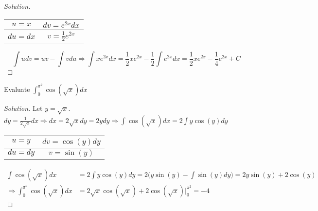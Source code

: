 \documentclass[crop=false,class=article,oneside]{standalone}
\begin{document}
        \begin{proof}[Solution]
        \
        \begin{table}[H]
            \centering
            \begin{tabular}{|c|c|}
                \hline
                $u=x$&$dv=e^{2x}dx$\\
                \hline
                $du=dx$&$v=\frac{1}{2}e^{2x}$\\
                \hline
            \end{tabular}
        \end{table}
        \begin{equation*}
            \int udv=uv-\int vdu\Rightarrow \int xe^{2x}dx=\frac{1}{2}xe^{2x}-\frac{1}{2}\int e^{2x}dx=\frac{1}{2}xe^{2x}-\frac{1}{4}e^{2x}+C
        \end{equation*}
        \end{proof}
        \begin{problem}
        Evaluate $\int_{0}^{\pi^{2}}\cos(\sqrt{x})dx$
        \end{problem}
        \begin{proof}[Solution]
        Let $y=\sqrt{x}$. $dy=\frac{1}{2\sqrt{x}}dx\Rightarrow dx=2\sqrt{x}dy=2ydy\Rightarrow\int\cos(\sqrt{x})dx=2\int y\cos(y)dy$
        \begin{table}[H]
            \centering
            \begin{tabular}{|c|c|}
                \hline
                $u=y$&$dv=\cos(y)dy$\\
                \hline
                $du=dy$&$v=\sin(y)$\\
                \hline
            \end{tabular}
        \end{table}
        \begin{align*}
            \int\cos(\sqrt{x})dx&=2\int y\cos(y)dy=2\big(y\sin(y)-\int\sin(y)dy\big)=2y\sin(y)+2\cos(y)\\
            \Rightarrow \int_{0}^{\pi^{2}}\cos(\sqrt{x})dx&=2\sqrt{x}\cos(\sqrt{x})+2\cos(\sqrt{x})\big|_{0}^{\pi^{2}}=-4
        \end{align*}
        \end{proof}
\end{document}
